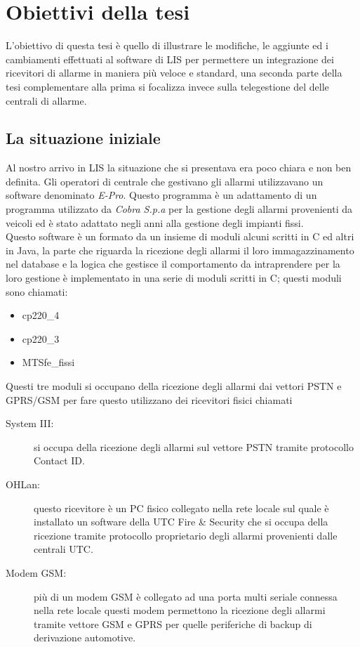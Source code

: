 \chapter{Obiettivi della tesi}
\label{capitolo3}
\thispagestyle{empty}

L'obiettivo di questa tesi è quello di illustrare le modifiche, le aggiunte ed i cambiamenti effettuati al software di LIS per permettere un integrazione dei ricevitori di allarme in maniera più veloce e standard, una seconda parte della tesi complementare alla prima si focalizza invece sulla telegestione del delle centrali di allarme. 
\section{La situazione iniziale}
Al nostro arrivo in LIS la situazione che si presentava era poco chiara e non ben definita. Gli operatori di centrale che gestivano gli allarmi utilizzavano un software denominato \emph{E-Pro}. Questo programma è un adattamento di un programma utilizzato da \emph{Cobra S.p.a} per la gestione degli allarmi provenienti da veicoli ed è stato adattato  negli anni alla gestione degli impianti fissi.\\
Questo software è un formato da un insieme di moduli alcuni scritti in C ed altri in Java, la parte che riguarda la ricezione degli allarmi il loro immagazzinamento nel database e la logica che gestisce il comportamento da intraprendere per la loro gestione è implementato in una serie di moduli scritti in C; questi moduli sono chiamati:
\begin{itemize}
	\item cp220\_4
	\item cp220\_3
	\item MTSfe\_fissi
\end{itemize}
Questi tre moduli si occupano della ricezione degli allarmi dai vettori PSTN e GPRS/GSM per fare questo utilizzano dei ricevitori fisici chiamati
\begin{description}
	\item[System III:] si occupa della ricezione degli allarmi sul vettore PSTN tramite protocollo Contact ID.
	\item[OHLan:] questo ricevitore è un PC fisico collegato nella rete locale sul quale è installato un software della UTC Fire \& Security che si occupa della ricezione tramite protocollo proprietario degli allarmi provenienti dalle centrali UTC.
	\item[Modem GSM:] più di un modem GSM è collegato ad una porta multi seriale connessa nella rete locale questi modem permettono la ricezione degli allarmi tramite vettore GSM e GPRS per quelle periferiche di backup di derivazione automotive.
\end{description}
